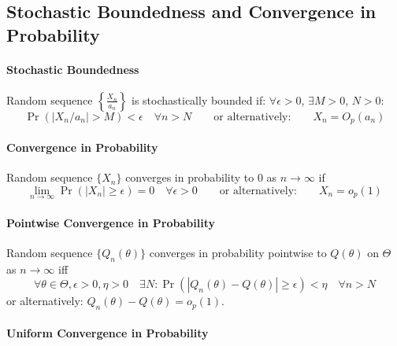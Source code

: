 \documentclass[a4paper]{article}
\numberwithin{equation}{subsection}
\begin{document}
\subsection{Stochastic Boundedness and Convergence in Probability}
\label{sec:stochastic_boundedness}

\paragraph{Stochastic Boundedness}

Random sequence 
\begin{math}
\left\{\frac{X_{n}}{a_{n}} \right\}  
\end{math}
 is stochastically bounded if:
$\forall \epsilon >0$, $\exists M > 0$, $N>0$:
\begin{equation}
  \label{eq:stochastic_boundedness}
  \Pr( | X_{n}/a_{n}| > M) < \epsilon
  \quad \forall n > N
  \qquad
  \text{or alternatively:}
  \qquad
  X_{n} = O_{p}(a_{n})
\end{equation}


\paragraph{Convergence in Probability}

Random sequence $\{X_{n}\}$ converges in probability to 0 as $n\to\infty$
if
\begin{equation}
  \label{eq:convergence_in_probability}
  \lim_{n\to\infty} \Pr( | X_{n}| \ge \epsilon) = 0
  \quad \forall \epsilon > 0
  \qquad
  \text{or alternatively:}
  \qquad
  X_{n} = o_{p}(1)
\end{equation}

\paragraph{Pointwise Convergence in Probability}

Random sequence $\{Q_{n}(\theta)\}$ converges in probability pointwise
to $Q(\theta)$ on $\Theta$ as $n\to\infty$
iff
\begin{equation}
  \label{eq:convergence_in_probability}
  \forall \theta\in\Theta, \epsilon>0, \eta > 0
  \quad
  \exists N:
  \Pr( | Q_{n}(\theta) - Q(\theta)| \ge \epsilon) < \eta
  \quad \forall n > N
\end{equation}
or alternatively: $Q_{n}(\theta) - Q(\theta) = o_{p}(1)$. 


\paragraph{Uniform Convergence in Probability}
\end{document}
